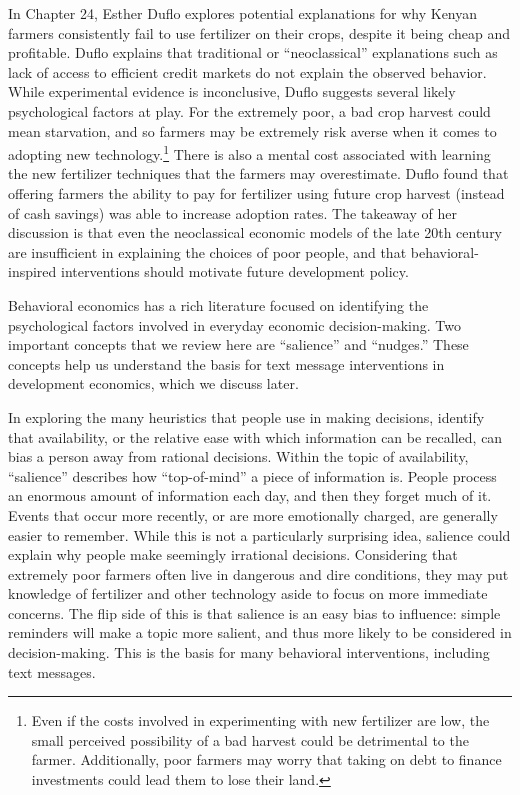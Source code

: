 \documentclass[12pt]{article}
\begin{document}
In \textcite{banerjee_understanding_2006} Chapter 24, Esther Duflo explores potential explanations for why Kenyan farmers consistently fail to use fertilizer on their crops, despite it being cheap and profitable. Duflo explains that traditional or ``neoclassical'' explanations such as lack of access to efficient credit markets do not explain the observed behavior. While experimental evidence is inconclusive, Duflo suggests several likely psychological factors at play. For the extremely poor, a bad crop harvest could mean starvation, and so farmers may be extremely risk averse when it comes to adopting new technology.\footnote{Even if the costs involved in experimenting with new fertilizer are low, the small perceived possibility of a bad harvest could be detrimental to the farmer. Additionally, poor farmers may worry that taking on debt to finance investments could lead them to lose their land.} There is also a mental cost associated with learning the new fertilizer techniques that the farmers may overestimate. Duflo found that offering farmers the ability to pay for fertilizer using future crop harvest (instead of cash savings) was able to increase adoption rates. The takeaway of her discussion is that even the neoclassical economic models of the late 20th century are insufficient in explaining the choices of poor people, and that behavioral-inspired interventions should motivate future development policy. 

Behavioral economics has a rich literature focused on identifying the psychological factors involved in everyday economic decision-making. Two important concepts that we review here are ``salience'' and ``nudges.'' These concepts help us understand the basis for text message interventions in development economics, which we discuss later.

In exploring the many heuristics that people use in making decisions, \textcite{tversky_judgment_1974} identify that availability, or the relative ease with which information can be recalled, can bias a person away from rational decisions. Within the topic of availability, ``salience'' describes how ``top-of-mind'' a piece of information is. People process an enormous amount of information each day, and then they forget much of it. Events that occur more recently, or are more emotionally charged, are generally easier to remember. While this is not a particularly surprising idea, salience could explain why people make seemingly irrational decisions. Considering that extremely poor farmers often live in dangerous and dire conditions, they may put knowledge of fertilizer and other technology aside to focus on more immediate concerns. The flip side of this is that salience is an easy bias to influence: simple reminders will make a topic more salient, and thus more likely to be considered in decision-making. This is the basis for many behavioral interventions, including text messages.
\end{document}

